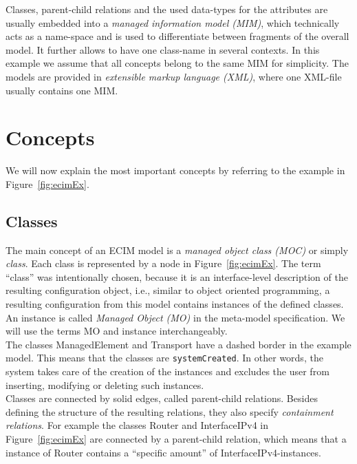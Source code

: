 Classes, parent-child relations and the used data-types for the attributes are usually embedded into a \emph{managed information model (MIM)}, which technically acts as a name-space and is used to differentiate between fragments of the overall model. It further allows to have one class-name in several contexts. In this example we assume that all concepts belong to the same MIM for simplicity. 
The models are provided in \emph{extensible markup language (XML)}, where one XML-file usually contains one MIM.\\

\section{Concepts}\label{sec:concepts}

We will now explain the most important concepts by referring to the example in Figure~\ref{fig:ecimEx}.


\subsection{Classes}\label{subsec:classes}

The main concept of an ECIM model is a \emph{managed object class (MOC)} or simply \emph{class}. Each class is represented by a node in Figure~\ref{fig:ecimEx}. The term ``class'' was intentionally chosen, because it is an interface-level description of the resulting configuration object, i.e., similar to object oriented programming, a resulting configuration from this model contains instances of the defined classes. An instance is called \emph{Managed Object (MO)} in the meta-model specification. We will use the terms MO and instance interchangeably.\\

The classes \textsf{ManagedElement} and \textsf{Transport} have a dashed border in the example model. This means that the classes are \verb|systemCreated|. In other words, the system takes care of the creation of the instances and excludes the user from inserting, modifying or deleting such instances. \\

Classes are connected by solid edges, called parent-child relations. Besides defining the structure of the resulting relations, they also specify \emph{containment relations}. For example the classes \textsf{Router} and \textsf{InterfaceIPv4} in Figure~\ref{fig:ecimEx} are connected by a parent-child relation, which means that a instance of \textsf{Router} contains a ``specific amount'' of \textsf{InterfaceIPv4}-instances.


